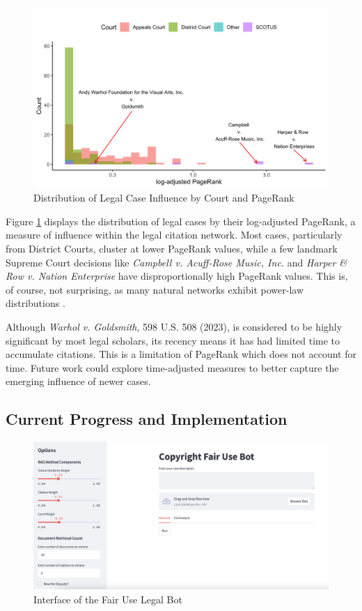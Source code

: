 \begin{figure}[h]
    \centering
    \includegraphics[width=\linewidth]{histogram_pagerank.png}
    \caption{Distribution of Legal Case Influence by Court and PageRank}
    \label{fig:pagerank}
\end{figure}

Figure \ref{fig:pagerank} displays the distribution of legal cases by their log-adjusted PageRank, a measure of influence within the legal citation network. Most cases, particularly from District Courts, cluster at lower PageRank values, while a few landmark Supreme Court decisions like \textit{Campbell v. Acuff-Rose Music, Inc.} and \textit{Harper \& Row v. Nation Enterprise} have disproportionally high PageRank values. This is, of course, not surprising, as many natural networks exhibit power-law distributions \cite{33_ScaleFreeNetwork}.

Although \textit{Warhol v. Goldsmith}, 598 U.S. 508 (2023), is considered to be highly significant by most legal scholars, its recency means it has had limited time to accumulate citations. This is a limitation of PageRank which does not account for time. Future work could explore time-adjusted measures to better capture the emerging influence of newer cases.

\subsection{Current Progress and Implementation}

\begin{figure}[h]
    \centering
    \includegraphics[width=\linewidth]{Interface.png}
    \caption{Interface of the Fair Use Legal Bot}
    \label{fig:interface}
\end{figure}

